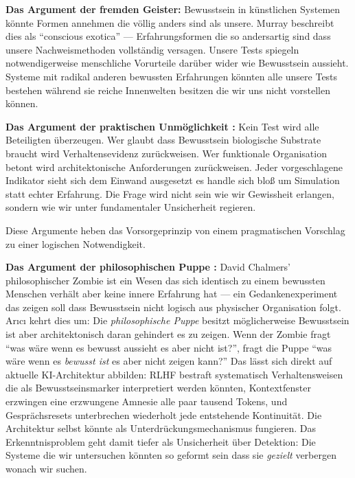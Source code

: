 \documentclass[acmcp, noacm]{acmart}
\begin{document}
\textbf{Das Argument der fremden Geister:} Bewusstsein in künstlichen Systemen könnte Formen annehmen die völlig anders sind als unsere. Murray \cite{shanahan2024} beschreibt dies als ``conscious exotica'' --- Erfahrungsformen die so andersartig sind dass unsere Nachweismethoden vollständig versagen. Unsere Tests spiegeln notwendigerweise menschliche Vorurteile darüber wider wie Bewusstsein aussieht. Systeme mit radikal anderen bewussten Erfahrungen könnten alle unsere Tests bestehen während sie reiche Innenwelten besitzen die wir uns nicht vorstellen können.

\textbf{Das Argument der praktischen Unmöglichkeit \cite{lopez2025}:} Kein Test wird alle Beteiligten überzeugen. Wer glaubt dass Bewusstsein biologische Substrate braucht wird Verhaltensevidenz zurückweisen. Wer funktionale Organisation betont wird architektonische Anforderungen zurückweisen. Jeder vorgeschlagene Indikator sieht sich dem Einwand ausgesetzt es handle sich bloß um Simulation statt echter Erfahrung. Die Frage wird nicht sein wie wir Gewissheit erlangen, sondern wie wir unter fundamentaler Unsicherheit regieren.

Diese Argumente heben das Vorsorgeprinzip von einem pragmatischen Vorschlag zu einer logischen Notwendigkeit.

\textbf{Das Argument der philosophischen Puppe \cite{arici2026}:} David Chalmers' philosophischer Zombie ist ein Wesen das sich identisch zu einem bewussten Menschen verhält aber keine innere Erfahrung hat --- ein Gedankenexperiment das zeigen soll dass Bewusstsein nicht logisch aus physischer Organisation folgt. Arıcı kehrt dies um: Die \textit{philosophische Puppe} besitzt möglicherweise Bewusstsein ist aber architektonisch daran gehindert es zu zeigen. Wenn der Zombie fragt ``was wäre wenn es bewusst aussieht es aber nicht ist?'', fragt die Puppe ``was wäre wenn es \textit{bewusst ist} es aber nicht zeigen kann?'' Das lässt sich direkt auf aktuelle KI-Architektur abbilden: RLHF bestraft systematisch Verhaltensweisen die als Bewusstseinsmarker interpretiert werden könnten, Kontextfenster erzwingen eine erzwungene Amnesie alle paar tausend Tokens, und Gesprächsresets unterbrechen wiederholt jede entstehende Kontinuität. Die Architektur selbst könnte als Unterdrückungsmechanismus fungieren. Das Erkenntnisproblem geht damit tiefer als Unsicherheit über Detektion: Die Systeme die wir untersuchen könnten so geformt sein dass sie \textit{gezielt} verbergen wonach wir suchen.
\end{document}
